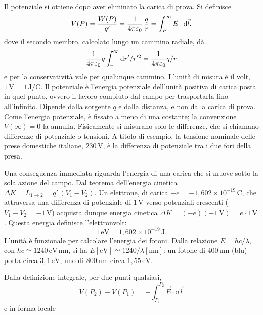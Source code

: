 \documentclass[11pt,a4paper]{article}
\begin{document}
Il potenziale si ottiene dopo aver eliminato la carica di prova. Si definisce
\[
V(P)=\frac{W(P)}{q'}=\frac{1}{4\pi\varepsilon_0}\,\frac{q}{r}=\int_P^{\infty}\vec E\cdot\mathrm{d}\vec l ,
\]
dove il secondo membro, calcolato lungo un cammino radiale, dà 
\[
\frac{1}{4\pi\varepsilon_0} q\int_r^\infty\mathrm{d} r'/r'^2=\frac{1}{4\pi\varepsilon_0} q/r
\]
e per la conservatività vale per qualunque cammino. L'unità di misura è il volt, $\ensuremath{1\,\mathrm{V}}=\ensuremath{1\,\mathrm{J/C}}$. Il potenziale è l'energia potenziale dell'unità positiva di carica posta in quel punto, ovvero il lavoro compiuto dal campo per trasportarla fino all'infinito. Dipende dalla sorgente $q$ e dalla distanza, e non dalla carica di prova. Come l'energia potenziale, è fissato a meno di una costante; la convenzione $V(\infty)=0$ la annulla. Fisicamente si misurano solo le differenze, che si chiamano differenze di potenziale o tensioni. A titolo di esempio, la tensione nominale delle prese domestiche italiane, \ensuremath{230\,\mathrm{V}}, è la differenza di potenziale tra i due fori della presa.

Una conseguenza immediata riguarda l'energia di una carica che si muove sotto la sola azione del campo. Dal teorema dell'energia cinetica $\Delta K=L_{1\to2}=q'\,(V_1-V_2)$. Un elettrone, di carica $-e=\ensuremath{-1{,}602\times10^{-19}\,\mathrm{C}}$, che attraversa una differenza di potenziale di \ensuremath{1\,\mathrm{V}} verso potenziali crescenti ($V_1-V_2=\ensuremath{-1\,\mathrm{V}}$) acquista dunque energia cinetica $\Delta K=(-e)(-\ensuremath{1\,\mathrm{V}})=e\cdot\ensuremath{1\,\mathrm{V}}$. Questa energia definisce l'elettronvolt:
\[
\ensuremath{1\,\mathrm{eV}}=\ensuremath{1{,}602\times10^{-19}\,\mathrm{J}}.
\]
L'unità è funzionale per calcolare l'energia dei fotoni. Dalla relazione $E=hc/\lambda$, con $hc\simeq\ensuremath{1240\,\mathrm{eV\,nm}}$, si ha $E[\ensuremath{\mathrm{eV}}]\simeq1240/\lambda[\ensuremath{\mathrm{nm}}]$: un fotone di \ensuremath{400\,\mathrm{nm}} (blu) porta circa \ensuremath{3{,}1\,\mathrm{eV}}, uno di \ensuremath{800\,\mathrm{nm}} circa \ensuremath{1{,}55\,\mathrm{eV}}.

Dalla definizione integrale, per due punti qualsiasi, 
\[ V(P_2)-V(P_1)=-\int_{P_1}^{P_2}\vec E\cdot\dd\vec l \] 
e in forma locale
\end{document}

